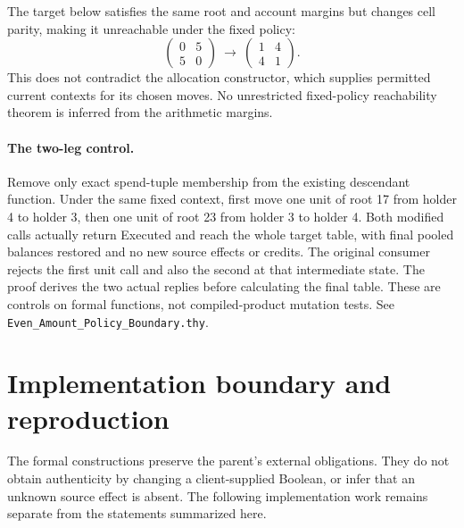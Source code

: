 \documentclass[10pt,a4paper]{article}
\newcommand{\code}[1]{\nolinkurl{#1}}
\newcommand{\source}[1]{\code{#1.thy}}
\begin{document}
The target below satisfies the same root and account margins but changes
cell parity, making it unreachable under the fixed policy:
\[
 \begin{pmatrix}0&5\\5&0\end{pmatrix}
 \ \longrightarrow\ 
 \begin{pmatrix}1&4\\4&1\end{pmatrix}.
\]
This does not contradict the allocation constructor, which supplies permitted
current contexts for its chosen moves. No unrestricted fixed-policy
reachability theorem is inferred from the arithmetic margins.

\paragraph{The two-leg control.}
Remove only exact spend-tuple membership from the existing descendant
function. Under the same fixed context, first move one unit of root 17 from
holder 4 to holder 3, then one unit of root 23 from holder 3 to holder 4.
Both modified calls actually return Executed and reach the whole target table,
with final pooled balances restored and no new source effects or credits.
The original consumer rejects the first unit call and also the second at that
intermediate state. The proof derives the two actual replies before calculating
the final table. These are controls on formal functions, not compiled-product
mutation tests. See \source{Even_Amount_Policy_Boundary}.

\clearpage
\section{Implementation boundary and reproduction}
The formal constructions preserve the parent's external obligations. They do
not obtain authenticity by changing a client-supplied Boolean, or infer that an
unknown source effect is absent. The following implementation work remains
separate from the statements summarized here.
\end{document}
